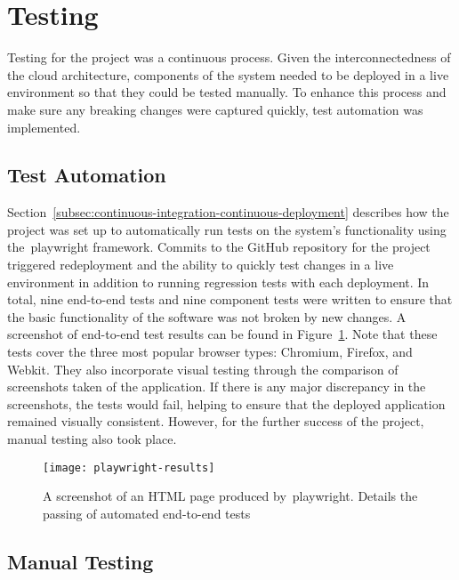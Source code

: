 \thispagestyle{plain}
\newpage
\section{Testing}\label{sec:testing}

\normalsize

Testing for the project was a continuous process.
Given the interconnectedness of the cloud architecture,
components of the system needed to be deployed in a live environment so that they could be tested manually.
To enhance this process and make sure any breaking changes were captured quickly,
test automation was implemented.

\subsection{Test Automation}\label{subsec:test-automation}

Section~\ref{subsec:continuous-integration-continuous-deployment} describes how the project was set up
to automatically run tests on the system's functionality using the~\gls{playwright} framework.
Commits to the GitHub repository for the project triggered redeployment and the ability
to quickly test changes in a live environment in addition to running regression tests with each deployment.
In total, nine end-to-end tests and nine component tests were written
to ensure that the basic functionality of the software was not broken by new changes.
A screenshot of end-to-end test results can be found in Figure~\ref{fig:playwright-results}.
Note that these tests cover the three most popular browser types: Chromium, Firefox, and Webkit.
They also incorporate visual testing through the comparison of screenshots taken of the application.
If there is any major discrepancy in the screenshots, the tests would fail,
helping to ensure that the deployed application remained visually consistent.
However, for the further success of the project, manual testing also took place.

\begin{figure}[!htb]
    \minipage{\textwidth}
    \texttt{[image: playwright-results]}
    \caption{A screenshot of an HTML page produced by~\gls{playwright}. Details the passing of automated end-to-end tests}\label{fig:playwright-results}
    \endminipage
\end{figure}

\subsection{Manual Testing}\label{subsec:manual-testing}

